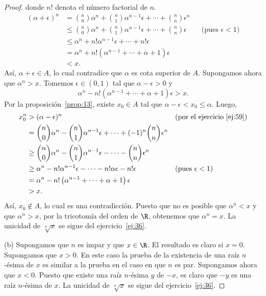 \documentclass[12pt,a4paper]{book}
\begin{document}
\begin{proof}
{        donde $n!$ denota el número factorial de $n$.}
        \begin{align*}
            (\alpha+\epsilon)^{n}&=\binom{n}{0}\alpha^{n}+\binom{n}{1}\alpha^{n-1}\epsilon+\cdots+\binom{n}{n}\epsilon^{n}\\
            &\leq\binom{n}{0}\alpha^{n}+\binom{n}{1}\alpha^{n-1}\epsilon+\cdots+\binom{n}{n}\epsilon &&\text{(pues $\epsilon<1$)}\\
            &\leq\alpha^{n}+n!\alpha^{n-1}\epsilon+\cdots+n!\epsilon\\
            &=\alpha^{n}+n!\left(\alpha^{n-1}+\cdots+\alpha+1\right)\epsilon\\
            &<x.
        \end{align*}
        Así, $\alpha+\epsilon\in A$, lo cual contradice que $\alpha$ es cota superior de $A$. Supongamos
        ahora que $\alpha^{n}>x$. Tomemos $\epsilon\in(0,1)$ tal que $\alpha-\epsilon>0$ y
        \begin{equation*}
            \alpha^{n}-n!\left(\alpha^{n-1}+\cdots+\alpha+1\right)\epsilon>x.
        \end{equation*}
        Por la proposición~\ref{prop:13}, existe $x_{0}\in A$ tal que $\alpha-\epsilon<x_{0}\leq\alpha$. Luego,
        \begin{align*}
            x_{0}^{n}&>(\alpha-\epsilon)^{n} &&\text{(por el ejercicio~\ref{ej:59})}\\
            &=\binom{n}{0}\alpha^{n}-\binom{n}{1}\alpha^{n-1}\epsilon+\cdots+(-1)^{n}\binom{n}{n}\epsilon^{n}\\
            &\geq\binom{n}{0}\alpha^{n}-\binom{n}{1}\alpha^{n-1}\epsilon-\cdots-\binom{n}{n}\epsilon^{n}\\
            &\geq\alpha^{n}-n!\alpha^{n-1}\epsilon-\cdots-n!\alpha\epsilon-n!\epsilon &&\text{(pues $\epsilon<1$)}\\
            &=\alpha^{n}-n!\left(\alpha^{n-1}+\cdots+\alpha+1\right)\epsilon\\
            &>x.
        \end{align*}
        Así, $x_{0}\notin A$, lo cual es una contradicción. Puesto que no es posible que $\alpha^{n}<x$
        y que $\alpha^{n}>x$, por la tricotomía del orden de $\R$, obtenemos que $\alpha^{n}=x$. La
        unicidad de $\sqrt[n]{x}$ se sigue del ejercicio~\ref{ej:36}.

        (b) Supongamos que $n$ es impar y que $x\in\R$. El resultado es claro si $x=0$.
        Supongamos que $x>0$. En este caso la prueba de la existencia de una raíz
        $n$-ésima de $x$ es similar a la prueba en el caso en que $n$ es par. Supongamos
        ahora que $x<0$. Puesto que existe una raíz $n$-ésima $y$ de $-x$, es claro que
        $-y$ es una raíz $n$-ésima de $x$. La unicidad de $\sqrt[n]{x}$ se sigue del ejercicio~\ref{ej:36}.
    \end{proof}
\end{document}
